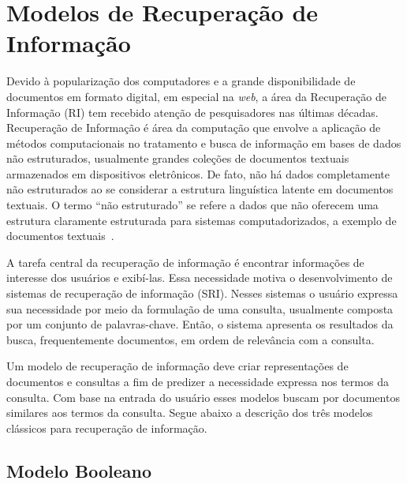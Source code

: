 
\section{Modelos de Recuperação de Informação}


Devido à popularização dos computadores e a grande disponibilidade de documentos em formato digital, em especial na \textit{web}, a área da Recuperação de Informação (RI) tem recebido atenção de pesquisadores nas últimas décadas. Recuperação de Informação é área da computação que envolve a aplicação de métodos computacionais no tratamento e busca de informação em bases de dados não estruturados, usualmente grandes coleções de documentos textuais armazenados em dispositivos eletrônicos. De fato, não há dados completamente não estruturados ao se considerar a estrutura linguística latente em documentos textuais. O termo ``não estruturado'' se refere a dados que não oferecem uma estrutura claramente estruturada para sistemas computadorizados, a exemplo de documentos 
textuais~\cite{Manning2008}.


A tarefa central da recuperação de informação é encontrar informações de interesse dos usuários e exibí-las. Essa necessidade motiva o desenvolvimento de sistemas de recuperação de informação (SRI). Nesses sistemas o usuário expressa sua necessidade por meio da formulação de uma consulta, usualmente composta por um conjunto de palavras-chave. Então, o sistema apresenta os resultados da busca, frequentemente documentos, em ordem de relevância com a consulta.  %



Um modelo de recuperação de informação deve criar representações de documentos e consultas a fim de predizer a necessidade expressa nos termos da consulta. Com base na entrada do usuário esses modelos buscam por documentos similares aos termos da consulta. Segue abaixo a descrição dos três modelos clássicos para recuperação de informação.

\subsection{Modelo Booleano}

